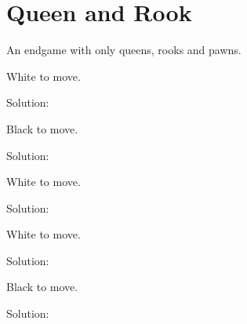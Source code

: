 \documentclass{book}
\begin{document}
\section{Queen and Rook}
An endgame with only queens, rooks and pawns.\begin{multicols}{2} 
\begin{samepage} 
\newgame 


 
\showboard
 
 White to move. 
 
Solution: 
 
\end{samepage}\begin{samepage} 
\newgame 


 
\showboard
 
 Black to move. 
 
Solution: 
 
\end{samepage}\begin{samepage} 
\newgame 


 
\showboard
 
 White to move. 
 
Solution: 
 
\end{samepage}\begin{samepage} 
\newgame 


 
\showboard
 
 White to move. 
 
Solution: 
 
\end{samepage}\begin{samepage} 
\newgame 


 
\showboard
 
 Black to move. 
 
Solution: 
 
\end{samepage}\begin{samepage} 
\newgame 


\end{samepage}
\end{multicols}
\end{document}
